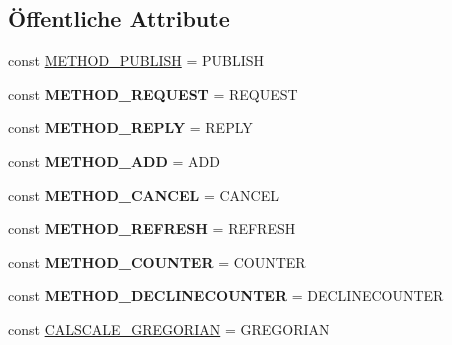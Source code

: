 \subsection*{Öffentliche Attribute}
\begin{DoxyCompactItemize}
\item 
const \mbox{\hyperlink{class_eluceo_1_1i_cal_1_1_component_1_1_calendar_a2bf3310558bd065e0b4fa2dde21a23b4}{M\+E\+T\+H\+O\+D\+\_\+\+P\+U\+B\+L\+I\+SH}} = \textquotesingle{}P\+U\+B\+L\+I\+SH\textquotesingle{}
\item 
\mbox{\label{class_eluceo_1_1i_cal_1_1_component_1_1_calendar_a903faa98fc0c4c6e09c84ba1d1115b94}} 
const {\bfseries M\+E\+T\+H\+O\+D\+\_\+\+R\+E\+Q\+U\+E\+ST} = \textquotesingle{}R\+E\+Q\+U\+E\+ST\textquotesingle{}
\item 
\mbox{\label{class_eluceo_1_1i_cal_1_1_component_1_1_calendar_a27a137bd7223f0cbb074c136d0cfd047}} 
const {\bfseries M\+E\+T\+H\+O\+D\+\_\+\+R\+E\+P\+LY} = \textquotesingle{}R\+E\+P\+LY\textquotesingle{}
\item 
\mbox{\label{class_eluceo_1_1i_cal_1_1_component_1_1_calendar_aa3f833738127efaf0d21747336da2f4a}} 
const {\bfseries M\+E\+T\+H\+O\+D\+\_\+\+A\+DD} = \textquotesingle{}A\+DD\textquotesingle{}
\item 
\mbox{\label{class_eluceo_1_1i_cal_1_1_component_1_1_calendar_a8b4509ee74893735c98a17f5eaac5265}} 
const {\bfseries M\+E\+T\+H\+O\+D\+\_\+\+C\+A\+N\+C\+EL} = \textquotesingle{}C\+A\+N\+C\+EL\textquotesingle{}
\item 
\mbox{\label{class_eluceo_1_1i_cal_1_1_component_1_1_calendar_a88d426d3447a73e39d89ca7c1d8ac4e5}} 
const {\bfseries M\+E\+T\+H\+O\+D\+\_\+\+R\+E\+F\+R\+E\+SH} = \textquotesingle{}R\+E\+F\+R\+E\+SH\textquotesingle{}
\item 
\mbox{\label{class_eluceo_1_1i_cal_1_1_component_1_1_calendar_aef854964fdd4c585944f97400b4d6489}} 
const {\bfseries M\+E\+T\+H\+O\+D\+\_\+\+C\+O\+U\+N\+T\+ER} = \textquotesingle{}C\+O\+U\+N\+T\+ER\textquotesingle{}
\item 
\mbox{\label{class_eluceo_1_1i_cal_1_1_component_1_1_calendar_ac5377d85edd9994a7ba415772d30b1ae}} 
const {\bfseries M\+E\+T\+H\+O\+D\+\_\+\+D\+E\+C\+L\+I\+N\+E\+C\+O\+U\+N\+T\+ER} = \textquotesingle{}D\+E\+C\+L\+I\+N\+E\+C\+O\+U\+N\+T\+ER\textquotesingle{}
\item 
const \mbox{\hyperlink{class_eluceo_1_1i_cal_1_1_component_1_1_calendar_a2172d47e85d1940456987e323f586ef6}{C\+A\+L\+S\+C\+A\+L\+E\+\_\+\+G\+R\+E\+G\+O\+R\+I\+AN}} = \textquotesingle{}G\+R\+E\+G\+O\+R\+I\+AN\textquotesingle{}
\end{DoxyCompactItemize}
